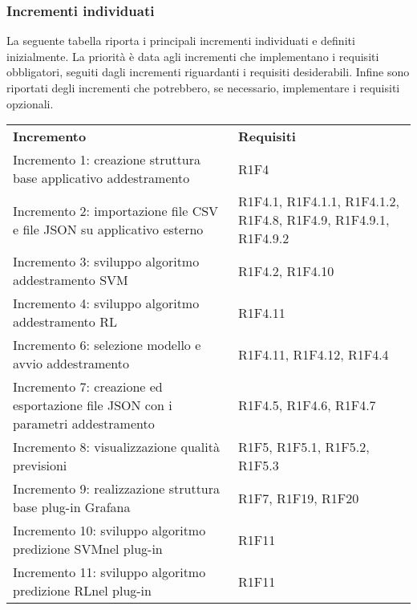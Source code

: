 \subsubsection{Incrementi individuati}
La seguente tabella riporta i principali incrementi individuati e definiti inizialmente. La priorità è data agli incrementi che implementano i requisiti obbligatori, seguiti dagli incrementi riguardanti i requisiti desiderabili. Infine sono riportati degli incrementi che potrebbero, se necessario, implementare i requisiti opzionali.
\begin{longtable} {
		>{\raggedright\arraybackslash}p{85mm}
		>{\raggedleft\arraybackslash}p{40mm}
	}
	\rowcolor{gray!50} 
	\textbf{Incremento} & 
	\textbf{Requisiti} 	\TBstrut \\
	
	Incremento 1: creazione struttura base applicativo addestramento &
	R1F4  \TBstrut \\ [2mm]		
	
	Incremento 2: importazione file CSV e file JSON su applicativo esterno & 
	R1F4.1, R1F4.1.1, R1F4.1.2, R1F4.8, R1F4.9, R1F4.9.1, R1F4.9.2  \TBstrut \\ [2mm]
	
	Incremento 3: sviluppo algoritmo addestramento SVM\glosp & 
	R1F4.2, R1F4.10  \TBstrut \\ [2mm]
	
	Incremento 4: sviluppo algoritmo addestramento RL\glosp & 
	R1F4.11  \TBstrut \\ [2mm]
	
	Incremento 6: selezione modello e avvio addestramento & 
	R1F4.11, R1F4.12, R1F4.4 \TBstrut \\ [2mm]
	
	Incremento 7: creazione ed esportazione file JSON con i parametri addestramento &
	R1F4.5, R1F4.6, R1F4.7 \TBstrut \\ [2mm]
	
	Incremento 8: visualizzazione qualità previsioni &
	R1F5, R1F5.1, R1F5.2, R1F5.3 \TBstrut \\ [2mm]
	
	Incremento 9: realizzazione struttura base plug-in Grafana\glosp &
	R1F7, R1F19, R1F20 \TBstrut \\ [2mm]
	
	Incremento 10: sviluppo algoritmo predizione SVM\glosp nel plug-in &
	R1F11 \TBstrut \\ [2mm]
	
	Incremento 11: sviluppo algoritmo predizione RL\glosp nel plug-in &
	R1F11 \TBstrut \\ [2mm]
	

\end{longtable}
